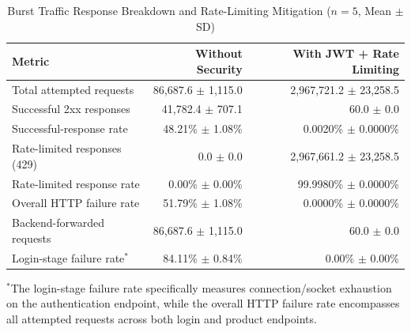 \begin{table}[!t]
  \centering
  \caption{Burst Traffic Response Breakdown and Rate-Limiting Mitigation ($n=5$, Mean $\pm$ SD)}
  \label{tab:burst-count-breakdown}
  \begin{tabular}{|l|r|r|}
    \hline
    \textbf{Metric} & \textbf{Without Security} & \textbf{With JWT + Rate Limiting} \\
    \hline
    Total attempted requests        & 86,687.6 $\pm$ 1,115.0 & 2,967,721.2 $\pm$ 23,258.5 \\
    Successful 2xx responses        & 41,782.4 $\pm$ 707.1 & 60.0 $\pm$ 0.0 \\
    Successful-response rate        & 48.21\% $\pm$ 1.08\% & 0.0020\% $\pm$ 0.0000\% \\
    Rate-limited responses (429)    & 0.0 $\pm$ 0.0 & 2,967,661.2 $\pm$ 23,258.5 \\
    Rate-limited response rate      & 0.00\% $\pm$ 0.00\% & 99.9980\% $\pm$ 0.0000\% \\
    Overall HTTP failure rate       & 51.79\% $\pm$ 1.08\% & 0.0000\% $\pm$ 0.0000\% \\
    Backend-forwarded requests      & 86,687.6 $\pm$ 1,115.0 & 60.0 $\pm$ 0.0 \\
    \hline
    Login-stage failure rate$^*$    & 84.11\% $\pm$ 0.84\% & 0.00\% $\pm$ 0.00\% \\
    \hline
  \end{tabular}
  \vspace{1ex}
  \raggedright
  \footnotesize{$^*$The login-stage failure rate specifically measures connection/socket exhaustion on the authentication endpoint, while the overall HTTP failure rate encompasses all attempted requests across both login and product endpoints.}
\end{table}
